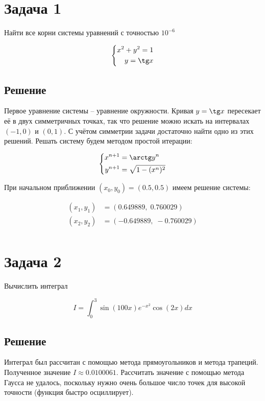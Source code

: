 \documentclass[a4paper,12pt]{article}
\begin{document}
\section*{Задача 1}

Найти все корни системы уравнений с точностью $10^{-6}$

\begin{equation*}
    \left\{
        \begin{aligned}
            x^2 + y^2 = 1 \\
            y = \tg x
        \end{aligned}
    \right.
\end{equation*}

\subsection*{Решение}

Первое уравнение системы -- уравнение окружности. Кривая $y = \tg x$ пересекает её в двух симметричных точках, так что решение можно искать на интервалах $(-1, 0)$ и $(0, 1)$. С учётом симметрии задачи достаточно найти одно из этих решений. Решать систему будем методом простой итерации:

\begin{equation*}
    \left\{
        \begin{aligned}
            x^{n + 1} &= \arctg y^n \\
            y^{n + 1} &= \sqrt{1 - (x^n)^2}
        \end{aligned}
    \right.
\end{equation*}

При начальном приближении $(x_0, y_0) = (0.5, 0.5)$ имеем решение системы:

\begin{align*}
    (x_1, y_1) &= (0.649889, \; 0.760029) \\
    (x_2, y_2) &= (-0.649889, \; -0.760029) \\
\end{align*}

\section*{Задача 2}

Вычислить интеграл

\begin{equation*}
    I = \int_0^3 \sin (100 x) e^{- x ^2} \cos (2 x) dx
\end{equation*}

\subsection*{Решение}

Интеграл был рассчитан с помощью метода прямоугольников и метода трапеций. Полученное значение $I \approx 0.0100061$. Рассчитать значение с помощью метода Гаусса не удалось, поскольку нужно очень большое число точек для высокой точности (функция быстро осциллирует).
\end{document}
